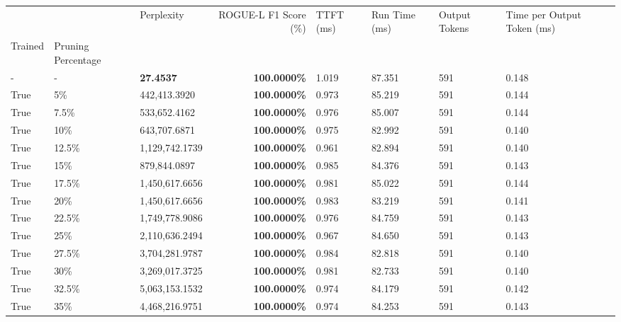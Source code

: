 \begin{table}[H]
\label{tab:evaluation-pipeline-4}
\begin{tabular}{lllrllll}
\toprule
 &  & Perplexity & ROGUE-L F1 Score (\%) & TTFT (ms) & Run Time (ms) & Output Tokens & Time per Output Token (ms) \\
Trained & Pruning Percentage &  &  &  &  &  &  \\
\midrule
- & - & \bfseries 27.4537 & \bfseries 100.0000\% & 1.019 & 87.351 & 591 & 0.148 \\
\cline{1-8} \cline{2-8}
True & 5\% & 442,413.3920 & \bfseries \color{red} 100.0000\% & 0.973 & 85.219 & 591 & 0.144 \\
\cline{1-8} \cline{2-8}
True & 7.5\% & 533,652.4162 & \bfseries \color{red} 100.0000\% & 0.976 & 85.007 & 591 & 0.144 \\
\cline{1-8} \cline{2-8}
True & 10\% & 643,707.6871 & \bfseries \color{red} 100.0000\% & 0.975 & 82.992 & 591 & 0.140 \\
\cline{1-8} \cline{2-8}
True & 12.5\% & 1,129,742.1739 & \bfseries \color{red} 100.0000\% & 0.961 & 82.894 & 591 & 0.140 \\
\cline{1-8} \cline{2-8}
True & 15\% & 879,844.0897 & \bfseries \color{red} 100.0000\% & 0.985 & 84.376 & 591 & 0.143 \\
\cline{1-8} \cline{2-8}
True & 17.5\% & 1,450,617.6656 & \bfseries \color{red} 100.0000\% & 0.981 & 85.022 & 591 & 0.144 \\
\cline{1-8} \cline{2-8}
True & 20\% & 1,450,617.6656 & \bfseries \color{red} 100.0000\% & 0.983 & 83.219 & 591 & 0.141 \\
\cline{1-8} \cline{2-8}
True & 22.5\% & 1,749,778.9086 & \bfseries \color{red} 100.0000\% & 0.976 & 84.759 & 591 & 0.143 \\
\cline{1-8} \cline{2-8}
True & 25\% & 2,110,636.2494 & \bfseries \color{red} 100.0000\% & 0.967 & 84.650 & 591 & 0.143 \\
\cline{1-8} \cline{2-8}
True & 27.5\% & 3,704,281.9787 & \bfseries \color{red} 100.0000\% & 0.984 & 82.818 & 591 & 0.140 \\
\cline{1-8} \cline{2-8}
True & 30\% & 3,269,017.3725 & \bfseries \color{red} 100.0000\% & 0.981 & 82.733 & 591 & 0.140 \\
\cline{1-8} \cline{2-8}
True & 32.5\% & 5,063,153.1532 & \bfseries \color{red} 100.0000\% & 0.974 & 84.179 & 591 & 0.142 \\
\cline{1-8} \cline{2-8}
True & 35\% & 4,468,216.9751 & \bfseries \color{red} 100.0000\% & 0.974 & 84.253 & 591 & 0.143 \\
\cline{1-8} \cline{2-8}

\end{tabular}
\end{table}
